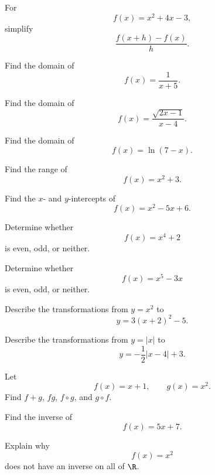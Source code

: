 \begin{exercise}[2]
For
\[ f(x)=x^2+4x-3, \]
simplify
\[ \frac{f(x+h)-f(x)}{h}. \]
\end{exercise}

\begin{exercise}[1]
Find the domain of
\[ f(x)=\frac{1}{x+5}. \]
\end{exercise}

\begin{exercise}[2]
Find the domain of
\[ f(x)=\frac{\sqrt{2x-1}}{x-4}. \]
\end{exercise}

\begin{exercise}[2]
Find the domain of
\[ f(x)=\ln(7-x). \]
\end{exercise}

\begin{exercise}[1]
Find the range of
\[ f(x)=x^2+3. \]
\end{exercise}

\begin{exercise}[2]
Find the \(x\)- and \(y\)-intercepts of
\[ f(x)=x^2-5x+6. \]
\end{exercise}

\begin{exercise}[1]
Determine whether
\[ f(x)=x^4+2 \]
is even, odd, or neither.
\end{exercise}

\begin{exercise}[1]
Determine whether
\[ f(x)=x^5-3x \]
is even, odd, or neither.
\end{exercise}

\begin{exercise}[2]
Describe the transformations from \(y=x^2\) to
\[ y=3(x+2)^2-5. \]
\end{exercise}

\begin{exercise}[2]
Describe the transformations from \(y=|x|\) to
\[ y=-\frac12|x-4|+3. \]
\end{exercise}

\begin{exercise}[1]
Let
\[ f(x)=x+1,\qquad g(x)=x^2. \]
Find \(f+g\), \(fg\), \(f\circ g\), and \(g\circ f\).
\end{exercise}

\begin{exercise}[2]
Find the inverse of
\[ f(x)=5x+7. \]
\end{exercise}

\begin{exercise}[2]
Explain why
\[ f(x)=x^2 \]
does not have an inverse on all of \(\R\).
\end{exercise}

